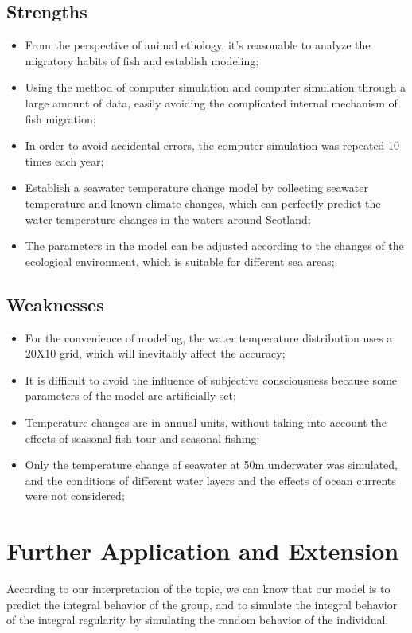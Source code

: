 \documentclass{mcmthesis}
\numberwithin{figure}{section}
\numberwithin{table}{section}
\begin{document}
\subsection{Strengths}

\begin{itemize}
  \item From the perspective of animal ethology, it's reasonable to analyze the migratory habits of fish and establish modeling;
  \item Using the method of computer simulation and computer simulation through a large amount of data, easily avoiding the complicated internal mechanism of fish migration;
  \item In order to avoid accidental errors, the computer simulation was repeated 10 times each year;
  \item Establish a seawater temperature change model by collecting seawater temperature and known climate changes, which can perfectly predict the water temperature changes in the waters around Scotland;
  \item The parameters in the model can be adjusted according to the changes of the ecological environment, which is suitable for different sea areas;
\end{itemize}

\subsection{Weaknesses}
\begin{itemize}
  \item For the convenience of modeling, the water temperature distribution uses a 20X10 grid, which will inevitably affect the accuracy;
  \item It is difficult to avoid the influence of subjective consciousness because some parameters of the model are artificially set;
  \item Temperature changes are in annual units, without taking into account the effects of seasonal fish tour and seasonal fishing;
  \item Only the temperature change of seawater at 50m underwater was simulated, and the conditions of different water layers and the effects of ocean currents were not considered;
\end{itemize}

\section{Further Application and Extension}
According to our interpretation of the topic, we can know that our model is to predict the integral behavior of the group, and to simulate the integral behavior of the integral regularity by simulating the random behavior of the individual.
\end{document}
